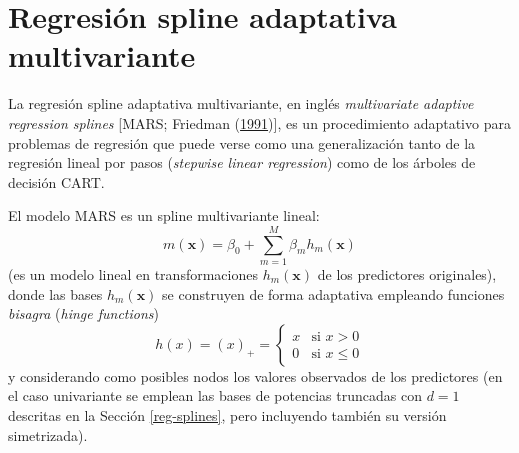 \documentclass[
]{book}
\theoremstyle{break}
\theoremstyle{nonumberplain}
\begin{document}
\hypertarget{mars}{%
\section{Regresión spline adaptativa multivariante}\label{mars}}

La regresión spline adaptativa multivariante, en inglés \emph{multivariate adaptive regression splines} {[}MARS; Friedman (\protect\hyperlink{ref-friedman1991multivariate}{1991}){]}, es un procedimiento adaptativo para problemas de regresión que puede verse como una generalización tanto de la regresión lineal por pasos (\emph{stepwise linear regression}) como de los árboles de decisión CART.

El modelo MARS es un spline multivariante lineal:\\
\[m(\mathbf{x}) = \beta_0 + \sum_{m=1}^M \beta_m h_m(\mathbf{x})\]
(es un modelo lineal en transformaciones \(h_m(\mathbf{x})\) de los predictores originales), donde las bases \(h_m(\mathbf{x})\) se construyen de forma adaptativa empleando funciones \emph{bisagra} (\emph{hinge functions})
\[ h(x) = (x)_+ = \left\{ \begin{array}{ll}
  x & \mbox{si } x > 0 \\
  0 & \mbox{si } x \leq 0
  \end{array}
  \right.\]
y considerando como posibles nodos los valores observados de los predictores
(en el caso univariante se emplean las bases de potencias truncadas con \(d=1\) descritas en la Sección \ref{reg-splines}, pero incluyendo también su versión simetrizada).
\end{document}

